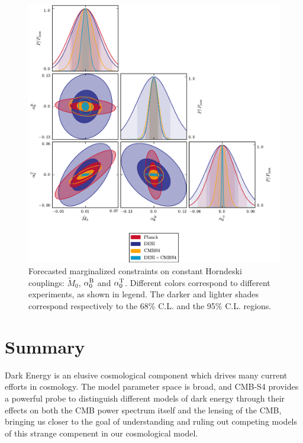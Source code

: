 \begin{figure}[!tb]
\begin{center}
\includegraphics[width=1.0\textwidth]{DarkEnergy/7_Const_alpha}
\caption{Forecasted marginalized constraints on constant Horndeski couplings: $\tilde{M}_{0}$, $\alpha^{\rm B}_0$ and $\alpha_0^{\rm T}$. Different colors correspond to different experiments, as shown in legend. The darker and lighter shades correspond respectively to the 68\% C.L. and the 95\% C.L. regions.}\label{fig:ConstantAlpha}
\end{center}
\end{figure}

\section{Summary}
Dark Energy is an elusive cosmological component which drives many current efforts in cosmology. The model parameter space is broad, and CMB-S4 provides a powerful probe to distinguish different models of dark energy through their effects on both the CMB power spectrum itself and the lensing of the CMB, bringing us closer to the goal of understanding and ruling out competing models of this strange compenent in our cosmological model.
%



